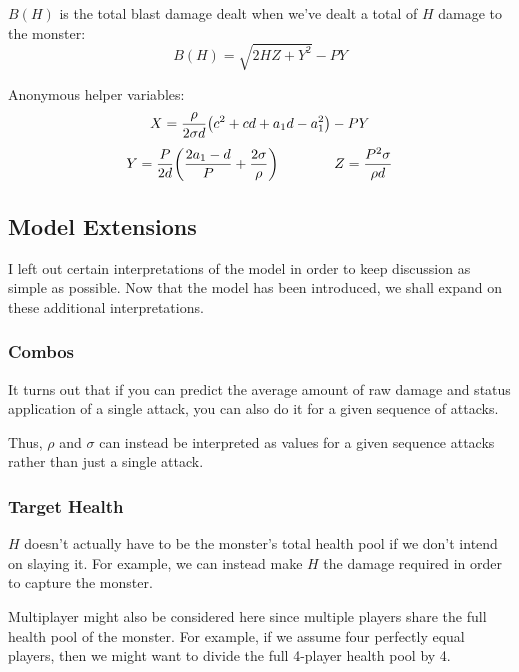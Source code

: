 \documentclass{article}
\begin{document}
$B(H)$ is the total blast damage dealt when we've dealt a total of $H$ damage to the monster:
\begin{equation}
    B (H) = \sqrt{2 H Z + Y^2} - PY
\end{equation}

Anonymous helper variables:
\begin{equation}
    X
    =
    \frac{\rho}{2 \sigma d} \parens*{c^2 + c d + a_1 d - a_1^2}
    - PY
\end{equation}
\begin{equation}
    Y
    =
    \frac{P}{2 d} 
    \parens*{
        \frac{2 a_1 - d}{P}
        + \frac{2 \sigma}{\rho} 
    }
    \qquad\qquad
    Z
    =
    \frac{P^2 \sigma}{\rho d} 
\end{equation}


\subsection{Model Extensions}%
\label{sub:model_extensions}

I left out certain interpretations of the model in order to keep discussion as simple as possible. Now that the model has been introduced, we shall expand on these additional interpretations.

\subsubsection{Combos}%
\label{ssub:combos}

It turns out that if you can predict the average amount of raw damage and status application of a single attack, you can also do it for a given sequence of attacks.

Thus, $\rho$ and $\sigma$ can instead be interpreted as values for a given sequence attacks rather than just a single attack.

\subsubsection{Target Health}%
\label{ssub:target_health}

$H$ doesn't actually have to be the monster's total health pool if we don't intend on slaying it. For example, we can instead make $H$ the damage required in order to capture the monster.

Multiplayer might also be considered here since multiple players share the full health pool of the monster. For example, if we assume four perfectly equal players, then we might want to divide the full 4-player health pool by 4.
\end{document}
